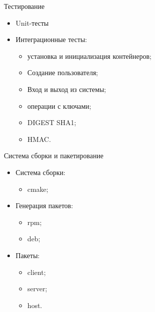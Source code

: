 \documentclass[utf8, 11pt]{beamer}
\begin{document}
\begin{frame}{Тестирование}
\begin{itemize}
\item Unit-тесты
\item Интеграционные тесты:
	\begin{itemize}
	\item установка и инициализация контейнеров;
	\item Создание пользователя;
	\item Вход и выход из системы;
	\item операции с ключами;
	\item DIGEST SHA1;
	\item HMAC.
	\end{itemize}
\end{itemize}
\end{frame}

\begin{frame}{Система сборки и пакетирование}
\begin{itemize}
\item Система сборки:
	\begin{itemize}
	\item cmake;
	\end{itemize}
\item Генерация пакетов:
	\begin{itemize}
	\item rpm;
	\item deb;
	\end{itemize}
\item Пакеты:
	\begin{itemize}
	\item client;
	\item server;
	\item host.
	\end{itemize}
\end{itemize}
\end{frame}
\end{document}
